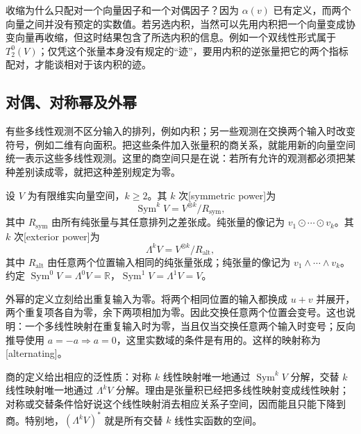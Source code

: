收缩为什么只配对一个向量因子和一个对偶因子？因为 \(\alpha(v)\) 已有定义，而两个向量之间并没有预定的实数值。若另选内积，当然可以先用内积把一个向量变成协变向量再收缩，但这时结果包含了所选内积的信息。例如一个双线性形式属于 \(T^0_2(V)\)；仅凭这个张量本身没有规定的“迹”，要用内积的逆张量把它的两个指标配对，才能谈相对于该内积的迹。

\subsection{对偶、对称幂及外幂}
\label{g1:subsec:1202:02}

有些多线性观测不区分输入的排列，例如内积；另一些观测在交换两个输入时改变符号，例如二维有向面积。把这些条件加入张量积的商关系，就能用新的向量空间统一表示这些多线性观测。这里的商空间只是在说：若所有允许的观测都必须把某种差别读成零，就把这种差别规定为零。

\begin{definition}
	\label{g1:def:symmetric-exterior-powers}
	设 \(V\) 为有限维实向量空间，\(k\ge2\)。其 \(k\) 次[symmetric power]为
	\[
		\operatorname{Sym}^kV=V^{\otimes k}/R_{\mathrm{sym}},
	\]
	其中 \(R_{\mathrm{sym}}\) 由所有纯张量与其任意排列之差张成。纯张量的像记为 \(v_1\odot\cdots\odot v_k\)。其 \(k\) 次[exterior power]为
	\[
		\Lambda^kV=V^{\otimes k}/R_{\mathrm{alt}},
	\]
	其中 \(R_{\mathrm{alt}}\) 由任意两个位置输入相同的纯张量张成；纯张量的像记为 \(v_1\wedge\cdots\wedge v_k\)。约定 \(\operatorname{Sym}^0V=\Lambda^0V=\mathbb R\)，\(\operatorname{Sym}^1V=\Lambda^1V=V\)。
\end{definition}

外幂的定义立刻给出重复输入为零。将两个相同位置的输入都换成 \(u+v\) 并展开，两个重复项各自为零，余下两项相加为零。因此交换任意两个位置会变号。这也说明：一个多线性映射在重复输入时为零，当且仅当交换任意两个输入时变号；反向推导使用 \(a=-a\Rightarrow a=0\)，这里实数域的条件是有用的。这样的映射称为[alternating]。

\ProseParagraphBreak

商的定义给出相应的泛性质：对称 \(k\) 线性映射唯一地通过 \(\operatorname{Sym}^kV\) 分解，交替 \(k\) 线性映射唯一地通过 \(\Lambda^kV\) 分解。理由是张量积已经把多线性映射变成线性映射；对称或交替条件恰好说这个线性映射消去相应关系子空间，因而能且只能下降到商。特别地，\((\Lambda^kV)^*\) 就是所有交替 \(k\) 线性实函数的空间。

